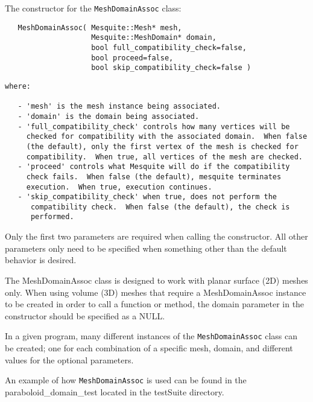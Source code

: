   The constructor for the \texttt{MeshDomainAssoc} class:

\begin{lstlisting}
   MeshDomainAssoc( Mesquite::Mesh* mesh, 
                    Mesquite::MeshDomain* domain, 
                    bool full_compatibility_check=false,
                    bool proceed=false,
                    bool skip_compatibility_check=false )
\end{lstlisting}

\begin{verbatim}
where:

   - 'mesh' is the mesh instance being associated.
   - 'domain' is the domain being associated.
   - 'full_compatibility_check' controls how many vertices will be 
     checked for compatibility with the associated domain.  When false 
     (the default), only the first vertex of the mesh is checked for
     compatibility.  When true, all vertices of the mesh are checked.
   - 'proceed' controls what Mesquite will do if the compatibility
     check fails.  When false (the default), mesquite terminates
     execution.  When true, execution continues.
   - 'skip_compatibility_check' when true, does not perform the
      compatibility check.  When false (the default), the check is 
      performed.
\end{verbatim}

Only the first two parameters are required when calling the constructor.  All other parameters only need to be specified when something other than the default behavior is desired.

The MeshDomainAssoc class is designed to work with planar surface (2D) meshes only.  When using volume (3D) meshes that require a MeshDomainAssoc instance to be created in order to call a function or method, the domain parameter in the constructor should be specified as a NULL. 

 In a given program, many different instances of the \texttt{MeshDomainAssoc} class can be created; one for each combination of a specific mesh, domain, and different values for the optional parameters.

An example of how \texttt{MeshDomainAssoc} is used can be found in the paraboloid\_domain\_test located in the testSuite directory.


